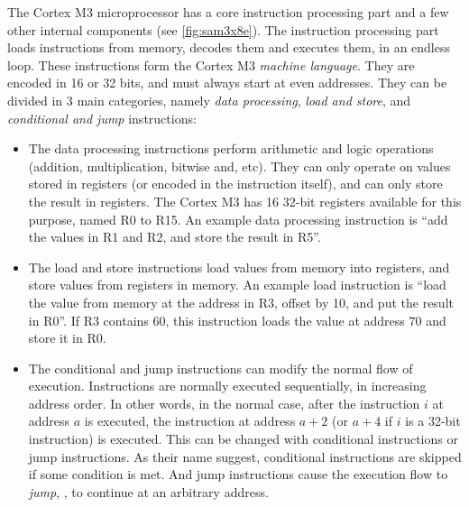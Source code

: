 The Cortex M3 microprocessor has a core instruction processing part and a few
other internal components (see \cref{fig:sam3x8e}). The instruction processing
part loads instructions from memory, decodes them and executes them, in an
endless loop. These instructions form the Cortex M3 {\em machine language}.
They are encoded in 16 or 32 bits, and must always start at even addresses.
They can be divided in 3 main categories, namely {\em data processing}, {\em
load and store}, and {\em conditional and jump} instructions:
\begin{itemize}
  \item The data processing instructions perform arithmetic and logic
  operations (addition, multiplication, bitwise and, etc). They can only
  operate on values stored in registers (or encoded in the instruction itself),
  and can only store the result in registers. The Cortex M3 has 16 32-bit
  registers available for this purpose, named R0 to R15. An example data
  processing instruction is ``add the values in R1 and R2, and store the result
  in R5''.

  \item The load and store instructions load values from memory into registers,
  and store values from registers in memory. An example load instruction is
  ``load the value from memory at the address in R3, offset by 10, and put the
  result in R0''. If R3 contains $60$, this instruction loads the value at
  address $70$ and store it in R0.

  \item The conditional and jump instructions can modify the normal flow of
  execution. Instructions are normally executed sequentially, in increasing
  address order. In other words, in the normal case, after the instruction $i$
  at address $a$ is executed, the instruction at address $a+2$ (or $a+4$ if $i$
  is a 32-bit instruction) is executed. This can be changed with conditional
  instructions or jump instructions. As their name suggest, conditional
  instructions are skipped if some condition is met. And jump instructions
  cause the execution flow to {\em jump}, \ie, to continue at an arbitrary
  address.
\end{itemize}

